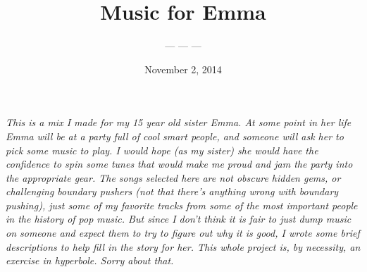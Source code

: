\documentclass[letterpaper,single]{article}
\title{Music for Emma}
\date{November 2, 2014} %
\author{--- --- --- }
\begin{document}
 
\maketitle
\textit{This is a mix I made for my 15 year old sister Emma. At some point in
her life Emma will be at a party full of cool smart people, and someone
will ask her to pick some music to play. I would hope (as my sister) she
would have the confidence to spin some tunes that would make me proud
and jam the party into the appropriate gear. The songs selected here
are not obscure hidden gems, or challenging boundary pushers (not that
there's anything wrong with boundary pushing), just some of my favorite
tracks from some of the most important people in the history of pop
music. But since I don't think it is fair to just dump music on someone
and expect them to try to figure out why it is good, I wrote some brief
descriptions to help fill in the story for her. This whole project is,
by necessity, an exercise in hyperbole. Sorry about that.}\\
\\
\end{document}
